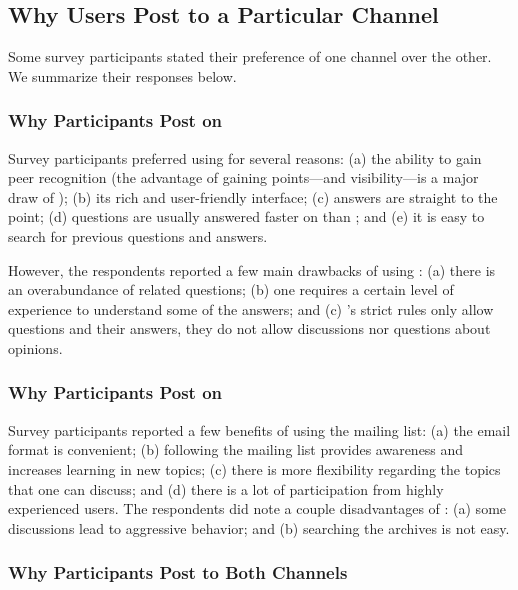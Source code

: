 \subsection{Why Users Post to a Particular Channel}
Some survey participants stated their preference of one channel over the other. We summarize their responses below.

\subsubsection{Why Participants Post on \SO}

Survey participants preferred using \SO for several reasons: (a) the ability to gain peer recognition (the advantage of gaining points---and visibility---is a major draw of \SO); (b) its rich and user-friendly interface; (c) answers are straight to the point; (d) questions are usually answered faster on \SO than \RH; and (e) it is easy to search for previous questions and answers.

However, the respondents reported a few main drawbacks of using \SO: (a) there is an overabundance of related questions; (b) one requires a certain level of experience to understand some of the answers; and (c) \SO's strict rules only allow questions and their answers, they do not allow discussions nor questions about opinions.


\subsubsection{Why Participants Post on \RH}
\label{sec:rh}

Survey participants reported a few benefits of using the \RH mailing list: (a) the email format is convenient; (b) following the mailing list provides awareness and increases learning in new topics; (c) there is more flexibility regarding the topics that one can discuss; and (d) there is a lot of participation from highly experienced users. The respondents did note a couple disadvantages of \RH: (a) some discussions lead to aggressive behavior; and (b) searching the archives is not easy.

\subsubsection{Why Participants Post to Both Channels}

